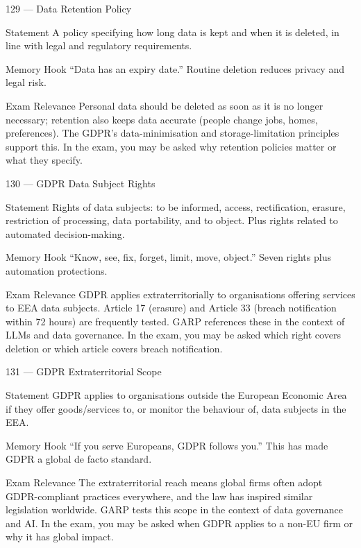 \documentclass[aspectratio=169,8pt]{beamer}
\begin{document}
	\begin{frame}{129 --- Data Retention Policy}
		\begin{block}{Statement}
			A policy specifying how long data is kept and when it is deleted, in line with legal and regulatory requirements.
		\end{block}
		\begin{block}{Memory Hook}
			``Data has an expiry date.'' Routine deletion reduces privacy and legal risk.
		\end{block}
		\begin{block}{Exam Relevance}
			Personal data should be deleted as soon as it is no longer necessary; retention also keeps data accurate (people change jobs, homes, preferences). The GDPR's data-minimisation and storage-limitation principles support this. In the exam, you may be asked why retention policies matter or what they specify.
		\end{block}
	\end{frame}
	
	\begin{frame}{130 --- GDPR Data Subject Rights}
		\begin{block}{Statement}
			Rights of data subjects: to be informed, access, rectification, erasure, restriction of processing, data portability, and to object. Plus rights related to automated decision-making.
		\end{block}
		\begin{block}{Memory Hook}
			``Know, see, fix, forget, limit, move, object.'' Seven rights plus automation protections.
		\end{block}
		\begin{block}{Exam Relevance}
			GDPR applies extraterritorially to organisations offering services to EEA data subjects. Article 17 (erasure) and Article 33 (breach notification within 72 hours) are frequently tested. GARP references these in the context of LLMs and data governance. In the exam, you may be asked which right covers deletion or which article covers breach notification.
		\end{block}
	\end{frame}
	
	\begin{frame}{131 --- GDPR Extraterritorial Scope}
		\begin{block}{Statement}
			GDPR applies to organisations outside the European Economic Area if they offer goods/services to, or monitor the behaviour of, data subjects in the EEA.
		\end{block}
		\begin{block}{Memory Hook}
			``If you serve Europeans, GDPR follows you.'' This has made GDPR a global de facto standard.
		\end{block}
		\begin{block}{Exam Relevance}
			The extraterritorial reach means global firms often adopt GDPR-compliant practices everywhere, and the law has inspired similar legislation worldwide. GARP tests this scope in the context of data governance and AI. In the exam, you may be asked when GDPR applies to a non-EU firm or why it has global impact.
		\end{block}
	\end{frame}
	
\end{document}
